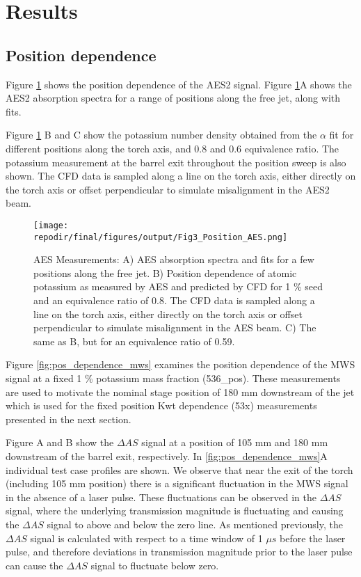 

\section{Results}

\subsection{Position dependence}

Figure \ref{fig:pos_dependence_aes} shows the position dependence of the AES2 signal. Figure \ref{fig:pos_dependence_aes}A shows the AES2 absorption spectra for a range of positions along the free jet, along with fits. 

Figure \ref{fig:pos_dependence_aes} B and C show the potassium number density obtained from the $\alpha$ fit for different positions along the torch axis, and 0.8 and 0.6 equivalence ratio. The potassium measurement at the barrel exit throughout the position sweep is also shown. The CFD data is sampled along a line on the torch axis, either directly on the torch axis or offset perpendicular to simulate misalignment in the AES2 beam. 

\begin{figure}[h]
    \texttt{[image: \\repodir/final/figures/output/Fig3\_Position\_AES.png]} 
    \caption{AES Measurements: A) AES absorption spectra and fits for a few positions along the free jet. B) Position dependence of atomic potassium as measured by AES and predicted by CFD for 1 \% seed and an equivalence ratio of 0.8. The CFD data is sampled along a line on the torch axis, either directly on the torch axis or offset perpendicular to simulate misalignment in the AES beam. C) The same as B, but for an equivalence ratio of 0.59. }
    \label{fig:pos_dependence_aes}
\end{figure}

Figure \ref{fig:pos_dependence_mws} examines the position dependence of the MWS signal at a fixed 1 \% potassium mass fraction (536\_pos).  These measurements are used to motivate the nominal stage position of 180 mm downstream of the jet which is used for the fixed position Kwt dependence (53x) measurements presented in the next section. 

Figure A and B show the $\Delta AS$ signal at a position of 105 mm and 180 mm downstream of the barrel exit, respectively. In \ref{fig:pos_dependence_mws}A individual test case profiles are shown. We observe that near the exit of the torch (including 105 mm position) there is a significant fluctuation in the MWS signal in the absence of a laser pulse. These fluctuations can be observed in the $\Delta AS$ signal, where the underlying transmission magnitude is fluctuating and causing the $\Delta AS$ signal to above and below the zero line. As mentioned previously, the $\Delta AS$ signal is calculated with respect to a time window of 1 $\mu s$ before the laser pulse, and therefore deviations in transmission magnitude prior to the laser pulse can cause the $\Delta AS$ signal to fluctuate below zero.

